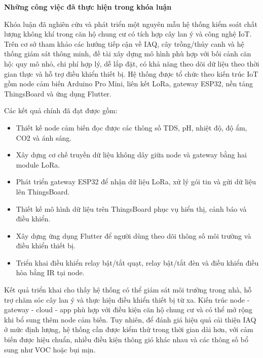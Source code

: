 \textbf{Những công việc đã thực hiện trong khóa luận}

Khóa luận đã nghiên cứu và phát triển một nguyên mẫu hệ thống kiểm soát chất lượng không khí trong căn hộ chung cư có tích hợp cây lan ý và công nghệ IoT. Trên cơ sở tham khảo các hướng tiếp cận về IAQ, cây trồng/thủy canh và hệ thống giám sát thông minh, đề tài xây dựng mô hình phù hợp với bối cảnh căn hộ: quy mô nhỏ, chi phí hợp lý, dễ lắp đặt, có khả năng theo dõi dữ liệu theo thời gian thực và hỗ trợ điều khiển thiết bị. Hệ thống được tổ chức theo kiến trúc IoT gồm node cảm biến Arduino Pro Mini, liên kết LoRa, gateway ESP32, nền tảng ThingsBoard và ứng dụng Flutter.

Các kết quả chính đã đạt được gồm:
\begin{itemize}
    \item Thiết kế node cảm biến đọc được các thông số TDS, pH, nhiệt độ, độ ẩm, CO2 và ánh sáng.
    \item Xây dựng cơ chế truyền dữ liệu không dây giữa node và gateway bằng hai module LoRa.
    \item Phát triển gateway ESP32 để nhận dữ liệu LoRa, xử lý gói tin và gửi dữ liệu lên ThingsBoard.
    \item Thiết kế mô hình dữ liệu trên ThingsBoard phục vụ hiển thị, cảnh báo và điều khiển.
    \item Xây dựng ứng dụng Flutter để người dùng theo dõi thông số môi trường và điều khiển thiết bị.
    \item Triển khai điều khiển relay bật/tắt quạt, relay bật/tắt đèn và điều khiển điều hòa bằng IR tại node.
\end{itemize}

Kết quả triển khai cho thấy hệ thống có thể giám sát môi trường trong nhà, hỗ trợ chăm sóc cây lan ý và thực hiện điều khiển thiết bị từ xa. Kiến trúc node - gateway - cloud - app phù hợp với điều kiện căn hộ chung cư và có thể mở rộng khi bổ sung thêm node cảm biến. Tuy nhiên, để đánh giá hiệu quả cải thiện IAQ ở mức định lượng, hệ thống cần được kiểm thử trong thời gian dài hơn, với cảm biến được hiệu chuẩn, nhiều điều kiện thông gió khác nhau và các thông số bổ sung như VOC hoặc bụi mịn.
